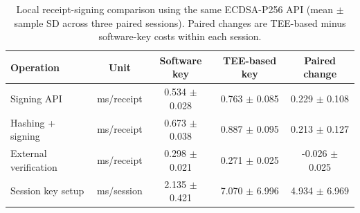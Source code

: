 \begin{table}[!t]
\centering
\caption{Local receipt-signing comparison using the same ECDSA-P256 API (mean $\pm$ sample SD across three paired sessions). Paired changes are TEE-based minus software-key costs within each session.}
\label{tab:c4-tee-signing}
\footnotesize
\renewcommand{\arraystretch}{1.08}
\begin{tabular*}{\textwidth}{@{\hspace{3pt}}l@{\extracolsep{\fill}}cccc@{\hspace{3pt}}}
\toprule
\textbf{Operation} & \textbf{Unit} & \textbf{Software key} & \textbf{TEE-based key} & \textbf{Paired change} \\
\midrule
Signing API & ms/receipt & 0.534 $\pm$ 0.028 & 0.763 $\pm$ 0.085 & 0.229 $\pm$ 0.108 \\
Hashing + signing & ms/receipt & 0.673 $\pm$ 0.038 & 0.887 $\pm$ 0.095 & 0.213 $\pm$ 0.127 \\
External verification & ms/receipt & 0.298 $\pm$ 0.021 & 0.271 $\pm$ 0.025 & -0.026 $\pm$ 0.025 \\
Session key setup & ms/session & 2.135 $\pm$ 0.421 & 7.070 $\pm$ 6.996 & 4.934 $\pm$ 6.969 \\
\bottomrule
\end{tabular*}
\end{table}
